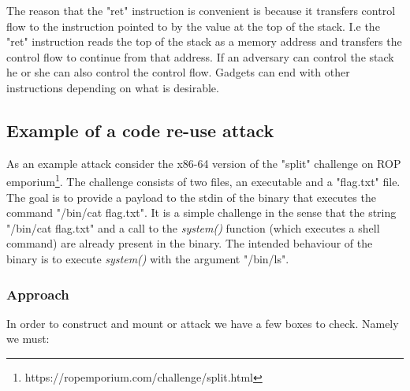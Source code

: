 The reason that the "ret" instruction is convenient is because it transfers control flow
to the instruction pointed to by the value at the top of the stack. I.e the "ret" instruction
reads the top of the stack as a memory address and transfers the control flow to continue
from that address. If an adversary can control the stack he or she can also control the
control flow. Gadgets can end with other instructions depending on what is desirable.

\subsection{Example of a code re-use attack}

As an example attack consider the x86-64 version of the "split" challenge on ROP emporium\footnote{https://ropemporium.com/challenge/split.html}.
The challenge consists of two files, an executable and a "flag.txt" file. The goal is to
provide a payload to the stdin of the binary that executes the command "/bin/cat flag.txt".
It is a simple challenge in the sense that the string "/bin/cat flag.txt" and a call to
the \textit{system()} function (which executes a shell command) are already present in the
binary. The intended behaviour of the binary is to execute \textit{system()} with the
argument "/bin/ls".

\subsubsection{Approach}

In order to construct and mount or attack we have a few boxes to check. Namely we must:

